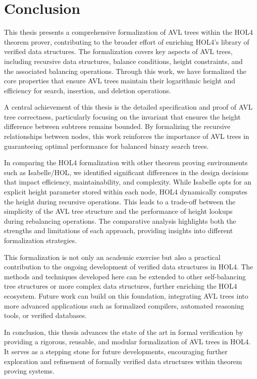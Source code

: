 \documentclass[12pt]{article}
\begin{document}
\section{Conclusion}
This thesis presents a comprehensive formalization of AVL trees within the HOL4 theorem prover, contributing to the broader effort of enriching HOL4's library of verified data structures. The formalization covers key aspects of AVL trees, including recursive data structures, balance conditions, height constraints, and the associated balancing operations. Through this work, we have formalized the core properties that ensure AVL trees maintain their logarithmic height and efficiency for search, insertion, and deletion operations.

A central achievement of this thesis is the detailed specification and proof of AVL tree correctness, particularly focusing on the invariant that ensures the height difference between subtrees remains bounded. By formalizing the recursive relationships between nodes, this work reinforces the importance of AVL trees in guaranteeing optimal performance for balanced binary search trees.

In comparing the HOL4 formalization with other theorem proving environments such as Isabelle/HOL, we identified significant differences in the design decisions that impact efficiency, maintainability, and complexity. While Isabelle opts for an explicit height parameter stored within each node, HOL4 dynamically computes the height during recursive operations. This leads to a trade-off between the simplicity of the AVL tree structure and the performance of height lookups during rebalancing operations. The comparative analysis highlights both the strengths and limitations of each approach, providing insights into different formalization strategies.

This formalization is not only an academic exercise but also a practical contribution to the ongoing development of verified data structures in HOL4. The methods and techniques developed here can be extended to other self-balancing tree structures or more complex data structures, further enriching the HOL4 ecosystem. Future work can build on this foundation, integrating AVL trees into more advanced applications such as formalized compilers, automated reasoning tools, or verified databases.

In conclusion, this thesis advances the state of the art in formal verification by providing a rigorous, reusable, and modular formalization of AVL trees in HOL4. It serves as a stepping stone for future developments, encouraging further exploration and refinement of formally verified data structures within theorem proving systems.



\end{document}
